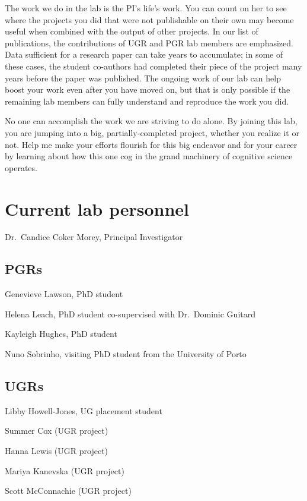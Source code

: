 \documentclass[
  12pt,
]{book}
\begin{document}
The work we do in the lab is the PI's life's work. You can count on her to see where the projects you did that were not publishable on their own may become useful when combined with the output of other projects. In our list of publications, the contributions of UGR and PGR lab members are emphasized. Data sufficient for a research paper can take years to accumulate; in some of these cases, the student co-authors had completed their piece of the project many years before the paper was published. The ongoing work of our lab can help boost your work even after you have moved on, but that is only possible if the remaining lab members can fully understand and reproduce the work you did.

No one can accomplish the work we are striving to do alone. By joining this lab, you are jumping into a big, partially-completed project, whether you realize it or not. Help me make your efforts flourish for this big endeavor and for your career by learning about how this one cog in the grand machinery of cognitive science operates.

\section{Current lab personnel}\label{current-lab-personnel}

Dr.~Candice Coker Morey, Principal Investigator

\subsection{PGRs}\label{pgrs}

Genevieve Lawson, PhD student

Helena Leach, PhD student co-supervised with Dr.~Dominic Guitard

Kayleigh Hughes, PhD student

Nuno Sobrinho, visiting PhD student from the University of Porto

\subsection{UGRs}\label{ugrs}

Libby Howell-Jones, UG placement student

Summer Cox (UGR project)

Hanna Lewis (UGR project)

Mariya Kanevska (UGR project)

Scott McConnachie (UGR project)
\end{document}
